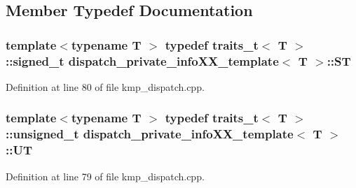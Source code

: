 \subsection{Member Typedef Documentation}
\hypertarget{structdispatch__private__infoXX__template_afec493a50230162ebb49ef3b83da3b43}{
\subsubsection[{S\-T}]{\setlength{\rightskip}{0pt plus 5cm}template$<$typename T $>$ typedef traits\-\_\-t$<$ T $>$\-::signed\-\_\-t {\bf dispatch\-\_\-private\-\_\-info\-X\-X\-\_\-template}$<$ T $>$\-::{\bf S\-T}}}\label{structdispatch__private__infoXX__template_afec493a50230162ebb49ef3b83da3b43}


Definition at line 80 of file kmp\-\_\-dispatch.\-cpp.

\hypertarget{structdispatch__private__infoXX__template_a36c3bad85f8de302d9d6692f5e365adc}{
\subsubsection[{U\-T}]{\setlength{\rightskip}{0pt plus 5cm}template$<$typename T $>$ typedef traits\-\_\-t$<$ T $>$\-::unsigned\-\_\-t {\bf dispatch\-\_\-private\-\_\-info\-X\-X\-\_\-template}$<$ T $>$\-::{\bf U\-T}}}\label{structdispatch__private__infoXX__template_a36c3bad85f8de302d9d6692f5e365adc}


Definition at line 79 of file kmp\-\_\-dispatch.\-cpp.



